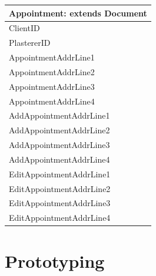 \begin{tabular}{|p{5cm}|}
	\hline
	\textbf{Appointment:} extends \textbf{Document} \\ \hline
		ClientID \\
		PlastererID \\
		AppointmentAddrLine1 \\
		AppointmentAddrLine2 \\
		AppointmentAddrLine3 \\
		AppointmentAddrLine4 \\ \hline
		AddAppointmentAddrLine1 \\
		AddAppointmentAddrLine2 \\
		AddAppointmentAddrLine3 \\
		AddAppointmentAddrLine4 \\
		EditAppointmentAddrLine1 \\
		EditAppointmentAddrLine2 \\
		EditAppointmentAddrLine3 \\
		EditAppointmentAddrLine4 \\ \hline

\end{tabular}

\section{Prototyping}

